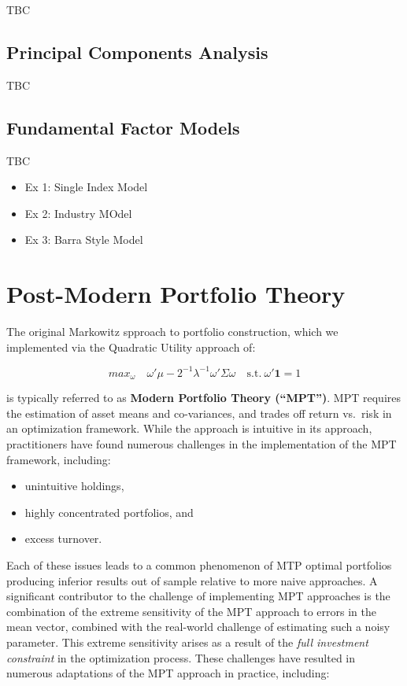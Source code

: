 \documentclass[]{book}
\providecommand{\tightlist}{%
  \setlength{\itemsep}{0pt}\setlength{\parskip}{0pt}}
\theoremstyle{definition}
\theoremstyle{definition}
\theoremstyle{definition}
\theoremstyle{remark}
\begin{document}
TBC

\section{Principal Components
Analysis}\label{principal-components-analysis}

TBC

\section{Fundamental Factor Models}\label{fundamental-factor-models}

TBC

\begin{itemize}
\tightlist
\item
  Ex 1: Single Index Model
\item
  Ex 2: Industry MOdel
\item
  Ex 3: Barra Style Model
\end{itemize}

\chapter{Post-Modern Portfolio Theory}\label{pmpt}

The original Markowitz spproach to portfolio construction, which we
implemented via the Quadratic Utility approach of:

\[
max_\omega \quad \omega' \mu - 2^{-1}\lambda^{-1} \omega' \Sigma \omega \quad \text{s.t.} \ \omega' \mathbf{1} = 1
\]

is typically referred to as \textbf{Modern Portfolio Theory (``MPT'')}.
MPT requires the estimation of asset means and co-variances, and trades
off return vs.~risk in an optimization framework. While the approach is
intuitive in its approach, practitioners have found numerous challenges
in the implementation of the MPT framework, including:

\begin{itemize}
\tightlist
\item
  unintuitive holdings,
\item
  highly concentrated portfolios, and
\item
  excess turnover.
\end{itemize}

Each of these issues leads to a common phenomenon of MTP optimal
portfolios producing inferior results out of sample relative to more
naive approaches. A significant contributor to the challenge of
implementing MPT approaches is the combination of the extreme
sensitivity of the MPT approach to errors in the mean vector, combined
with the real-world challenge of estimating such a noisy parameter. This
extreme sensitivity arises as a result of the \emph{full investment
constraint} in the optimization process. These challenges have resulted
in numerous adaptations of the MPT approach in practice, including:
\end{document}
